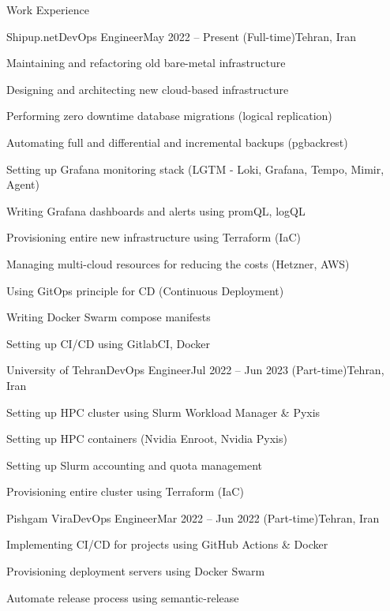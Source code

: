 \documentclass[]{main}
\begin{document}
\begin{section}{Work Experience}
    \begin{subsection}{Shipup.net}{DevOps Engineer}{May 2022 -- Present (Full-time)}{Tehran, Iran}
        \item Maintaining and refactoring old bare-metal infrastructure 
        \item Designing and architecting new cloud-based infrastructure 
        \item Performing zero downtime database migrations (logical replication) 
        \item Automating full and differential and incremental backups (pgbackrest) 
        \item Setting up Grafana monitoring stack (LGTM - Loki, Grafana, Tempo, Mimir, Agent) 
        \item Writing Grafana dashboards and alerts using promQL, logQL 
        \item Provisioning entire new infrastructure using Terraform (IaC) 
        \item Managing multi-cloud resources for reducing the costs (Hetzner, AWS) 
        \item Using GitOps principle for CD (Continuous Deployment) 
        \item Writing Docker Swarm compose manifests 
        \item Setting up CI/CD using GitlabCI, Docker 
        \end{subsection}
\begin{subsection}{University of Tehran}{DevOps Engineer}{Jul 2022 -- Jun 2023 (Part-time)}{Tehran, Iran}
        \item Setting up HPC cluster using Slurm Workload Manager \& Pyxis 
        \item Setting up HPC containers (Nvidia Enroot, Nvidia Pyxis) 
        \item Setting up Slurm accounting and quota management 
        \item Provisioning entire cluster using Terraform (IaC) 
        \end{subsection}
\begin{subsection}{Pishgam Vira}{DevOps Engineer}{Mar 2022 -- Jun 2022 (Part-time)}{Tehran, Iran}
        \item Implementing CI/CD for projects using GitHub Actions \& Docker 
        \item Provisioning deployment servers using Docker Swarm 
        \item Automate release process using semantic-release 

\end{subsection}
\end{section}
\end{document}
